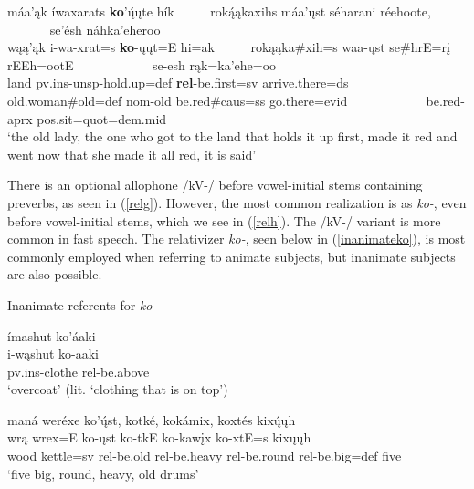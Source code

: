 \begin{exe}
\begin{xlist}
	\item\label{relh} \glll máa'ąk íwaxarats \textbf{ko}'ų́ųte hík ~ ~ ~  roką́ąkaxihs máa'ųst séharani réehoote, ~ ~ ~ ~ ~ ~ ~ se'ésh náhka'eheroo\\
		wąą'ąk i-wa-xrat=s \textbf{ko}-ųųt=E hi=ak ~ ~ ~  rokąąka\#xih=s waa-ųst se\#hrE=rį rEEh=ootE ~ ~ ~ ~ ~ ~ ~  se-esh rąk=ka'ehe=oo\\
		\textnormal{land} pv.ins-unsp-\textnormal{hold.up}=def \textbf{rel}-\textnormal{be.first}=sv \textnormal{arrive.there}=ds ~ ~ ~ \textnormal{old.woman}\#\textnormal{old}=def nom-\textnormal{old} \textnormal{be.red}\#caus=ss \textnormal{go.there}=evid ~ ~ ~ ~ ~ ~ ~   \textnormal{be.red}-aprx pos.sit=quot=dem.mid\\
		\glt `the old lady, the one who got to the land that holds it up first, made it red and went now that she made it all red, it is said' \citep[123]{hollow1973a}
	
	\end{xlist}

\end{exe}

There is an optional allophone /kV-/ before vowel-initial stems containing preverbs, as seen in (\ref{relg}). However, the most common realization is as \textit{ko-}, even before vowel-initial stems, which we see in (\ref{relh}). The /kV-/ variant is more common in fast speech. The relativizer \textit{ko-}, seen below in (\ref{inanimateko}), is most commonly employed when referring to animate subjects, but inanimate subjects are also possible.

\newpage
\begin{exe}

\item\label{inanimateko} Inanimate referents for \textit{ko-}

	\begin{xlist}
	
	\item \glll ímashut ko'áaki\\
	i-wąshut ko-aaki\\
	pv.ins-\textnormal{clothe} rel-\textnormal{be.above}\\
	\glt `overcoat' (lit. `clothing that is on top')
	
	\item \glll maná weréxe ko'ų́st, kotké, kokámix, koxtés kixų́ųh\\
	wrą wrex=E ko-ųst ko-tkE ko-kawįx ko-xtE=s kixųųh\\
	\textnormal{wood} \textnormal{kettle}=sv rel-\textnormal{be.old} rel-\textnormal{be.heavy} rel-\textnormal{be.round} rel-\textnormal{be.big}=def \textnormal{five}\\
	\glt `five big, round, heavy, old drums' \citep[21]{mixco1997a}
	
	\end{xlist}

\end{exe} 

